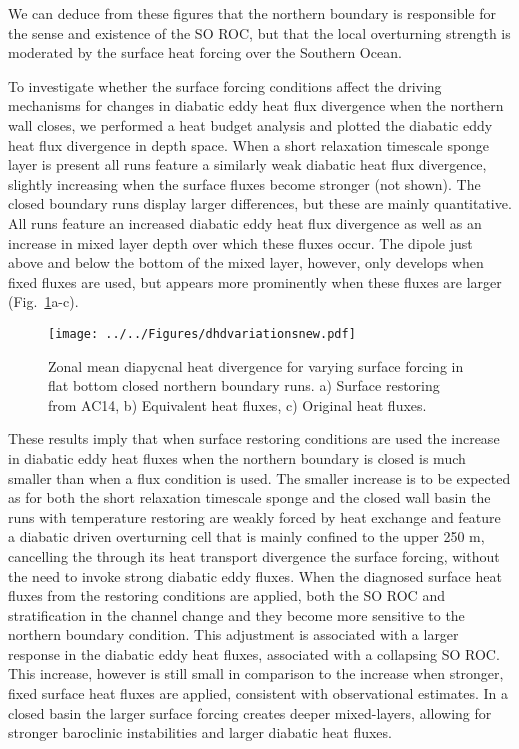We can deduce from these figures that the northern boundary is responsible for the sense and existence of the SO ROC, but that the local overturning strength is moderated by the surface heat forcing over the Southern Ocean. 

To investigate whether the surface forcing conditions affect the driving mechanisms for changes in diabatic eddy heat flux divergence when the northern wall closes, we performed a heat budget analysis and plotted the diabatic eddy heat flux divergence in depth space. When a short relaxation timescale sponge layer is present all runs feature a similarly weak diabatic heat flux divergence, slightly increasing when the surface fluxes become stronger (not shown). The closed boundary runs display larger differences, but these are mainly quantitative. All runs feature an increased diabatic eddy heat flux divergence as well as an increase in mixed layer depth over which these fluxes occur. The dipole just above and below the bottom of the mixed layer, however, only develops when fixed fluxes are used, but appears more prominently when these fluxes are larger (Fig.~\ref{fig:dhdvary}a-c). 

\begin{figure}[H]
\center
\noindent \texttt{[image: ../../Figures/dhdvariationsnew.pdf]} 
\caption{Zonal mean diapycnal heat divergence for varying surface forcing in flat bottom closed northern boundary runs. a) Surface restoring from AC14, b) Equivalent heat fluxes, c) Original heat fluxes.}
\label{fig:dhdvary}
\end{figure}

These results imply that when surface restoring conditions are used the increase in diabatic eddy heat fluxes when the northern boundary is closed is much smaller than when a flux condition is used. The smaller increase is to be expected as for both the short relaxation timescale sponge and the closed wall basin the runs with temperature restoring are weakly forced by heat exchange and feature a diabatic driven overturning cell that is mainly confined to the upper 250 m, cancelling the through its heat transport divergence the surface forcing, without the need to invoke strong diabatic eddy fluxes. When the diagnosed surface heat fluxes from the restoring conditions are applied, both the SO ROC and stratification in the channel change and they become more sensitive to the northern boundary condition. This adjustment is associated with a larger response in the diabatic eddy heat fluxes, associated with a collapsing SO ROC. This increase, however is still small in comparison to the increase when stronger, fixed surface heat fluxes are applied, consistent with observational estimates. In a closed basin the larger surface forcing creates deeper mixed-layers, allowing for stronger baroclinic instabilities and larger diabatic heat fluxes.

